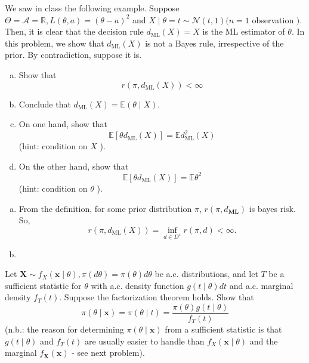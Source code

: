 \begin{ex}
    We saw in class the following example. Suppose \(\Theta=\mathcal{A}=\mathbb{R}, L(\theta, a)=(\theta-a)^{2}\) and \(X \mid \theta=t \sim \mathcal{N}(t, 1)(n=1\) observation \() .\) Then, it is clear that the decision rule \(d_{\mathrm{ML}}(X)=X\) is the ML estimator of \(\theta\). In this problem, we show that \(d_{\mathrm{ML}}(X)\) is not a Bayes rule, irrespective of the prior. By contradiction, suppose it is. 
    \begin{enumerate}[(a)]
        \item Show that
        \[
            r\left(\pi, d_{\mathrm{ML}}(X)\right)<\infty
        \]
        \item Conclude that \(d_{\mathrm{ML}}(X)=\mathbb{E}(\theta \mid X)\). 
        \item On one hand, show that
        \[
        \mathbb{E}\left[\theta d_{\mathrm{ML}}(X)\right]=\mathbb{E} d_{\mathrm{ML}}^{2}(X)
        \]
        (hint: condition on \(X\) ). 
        \item  On the other hand, show that
        \[
        \mathbb{E}\left[\theta d_{\mathrm{ML}}(X)\right]=\mathbb{E} \theta^{2}
        \]
        (hint: condition on \(\theta\) ).
    \end{enumerate}
\end{ex}

\begin{solution}
    \begin{enumerate}[(a)]
        \item From the definition, for some prior distribution $\pi$, $r(\pi, d_{\mathbf{ML}})$ is bayes risk. So, 
        \[
            r(\pi, d_{\mathrm{ML}}(X)) = \inf_{d\in D^\star} r(\pi, d)<\infty. 
        \]
        \item 
    \end{enumerate}
\end{solution}


\begin{ex}
    Let \(\mathbf{X} \sim f_{X}(\mathbf{x} \mid \theta), \pi(d \theta)=\pi(\theta) d \theta\) be a.c. distributions, and let \(T\) be a sufficient statistic for \(\theta\) with a.c. density function \(g(t \mid \theta) d t\) and a.c. marginal density \(f_{T}(t)\). Suppose the factorization theorem holds. Show that
\[
\pi(\theta \mid \mathbf{x})=\pi(\theta \mid t)=\frac{\pi(\theta) g(t \mid \theta)}{f_{T}(t)}
\]
(n.b.: the reason for determining \(\pi(\theta \mid \mathbf{x})\) from a sufficient statistic is that \(g(t \mid \theta)\) and \(f_{T}(t)\) are usually easier to handle than \(f_{X}(\mathbf{x} \mid \theta)\) and the marginal \(f_{\mathbf{X}}(\mathbf{x})\) - see next problem).
\end{ex}


